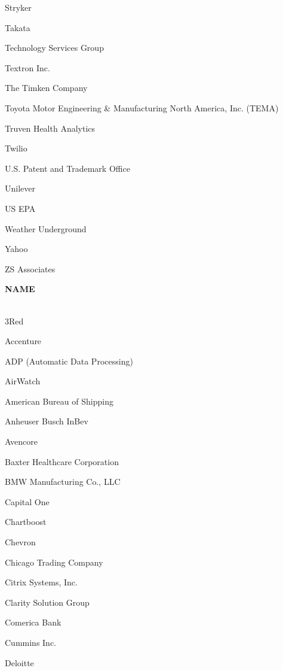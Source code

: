 \documentclass[twoside]{article}
\begin{document}
\begin{center}
\begin{multicols}{5}
\begin{FlushLeft}
\begin{compactitem}
\item Stryker
\item Takata
\item Technology Services Group
\item Textron Inc.
\item The Timken Company
\item Toyota Motor Engineering \& Manufacturing North America, Inc. (TEMA)
\item Truven Health Analytics
\item Twilio
\item U.S. Patent and Trademark Office
\item Unilever
\item US EPA
\item Weather Underground
\item Yahoo
\item ZS Associates
\end{compactitem}
        \end{FlushLeft}
        \vspace{1em}
        {\fontsize{14}{16}\selectfont \bf NAME}\\
        \vspace{-1em}
        ~\hrulefill~
        \vspace{-.9em}
        \begin{FlushLeft}
        \begin{compactitem}
        \item 3Red
\item Accenture
\item ADP (Automatic Data Processing)
\item AirWatch
\item American Bureau of Shipping
\item Anheuser Busch InBev
\item Avencore
\item Baxter Healthcare Corporation
\item BMW Manufacturing Co., LLC
\item Capital One
\item Chartboost
\item Chevron
\item Chicago Trading Company
\item Citrix Systems, Inc.
\item Clarity Solution Group
\item Comerica Bank
\item Cummins Inc.
\item Deloitte

\end{compactitem}
\end{FlushLeft}
\end{multicols}
\end{center}
\end{document}
